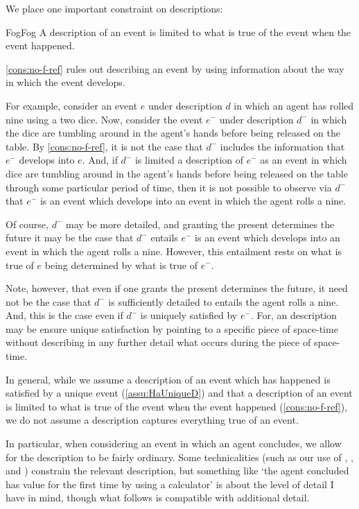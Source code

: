 \begin{note}
  We place one important constraint on descriptions:

  \begin{constraint}{Fog}{Fog}%
    \label{cons:no-f-ref}%
    A description of an event is limited to what is true of the event when the event happened.
  \end{constraint}

  \noindent%
  \autoref{cons:no-f-ref} rules out describing an event by using information about the way in which the event develops.

  For example, consider an event \(e\) under description \(d\) in which an agent has rolled nine using a two dice.
  Now, consider the event \(e^{-}\) under description \(d^{-}\) in which the dice are tumbling around in the agent's hands before being released on the table.
  By \autoref{cons:no-f-ref}, it is not the case that \(d^{-}\) includes the information that \(e^{-}\) develops into \(e\).
  And, if \(d^{-}\) is limited a description of \(e^{-}\) as an event in which dice are tumbling around in the agent's hands before being released on the table through some particular period of time, then it is not possible to observe via \(d^{-}\) that \(e^{-}\) is an event which develops into an event in which the agent rolls a nine.

  Of course, \(d^{-}\) may be more detailed, and granting the present determines the future it may be the case that \(d^{-}\) entails \(e^{-}\) is an event which develops into an event in which the agent rolls a nine.
  However, this entailment rests on what is true of \(e\) being determined by what is true of \(e^{-}\).

  Note, however, that even if one grants the present determines the future, it need not be the case that \(d^{-}\) is sufficiently detailed to entails the agent rolls a nine.
  And, this is the case even if \(d^{-}\) is uniquely satisfied by \(e^{-}\).
  For, an description may be ensure unique satisfaction by pointing to a specific piece of space-time without describing in any further detail what occurs during the piece of space-time.
\end{note}


\begin{note}
  In general, while we assume a description of an event which has happened is satisfied by a unique event (\autoref{assu:HaUniqueD}) and that a description of an event is limited to what is true of the event when the event happened (\autoref{cons:no-f-ref}), we do not assume a description captures everything true of an event.

  In particular, when considering an event in which an agent concludes, we allow for the description to be fairly ordinary.
  Some technicalities (such as our use of , , and ) constrain the relevant description, but something like `the agent concluded \gistCalcEq{} has value  for the first time by using a calculator' is about the level of detail I have in mind, though what follows is compatible with additional detail.
\end{note}



